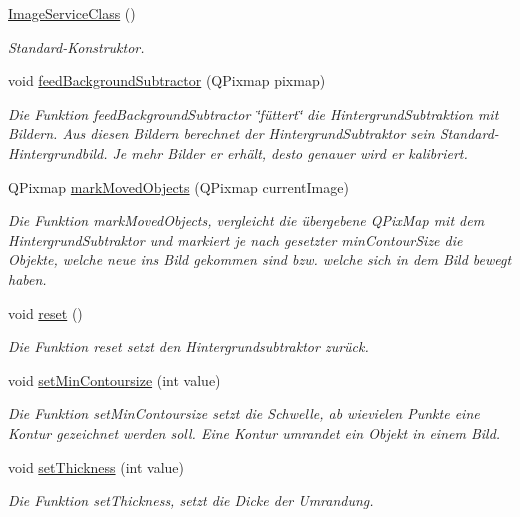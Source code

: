 \begin{DoxyCompactItemize}
\item 
\hypertarget{class_image_service_class_ac513fca164499b62c9527ee1c1ecaa5f}{}\hyperlink{class_image_service_class_ac513fca164499b62c9527ee1c1ecaa5f}{Image\+Service\+Class} ()\label{class_image_service_class_ac513fca164499b62c9527ee1c1ecaa5f}

\begin{DoxyCompactList}\small\item\em Standard-\/\+Konstruktor. \end{DoxyCompactList}\item 
void \hyperlink{class_image_service_class_a2285756f94ae97be90c4b22334dbff07}{feed\+Background\+Subtractor} (Q\+Pixmap pixmap)
\begin{DoxyCompactList}\small\item\em Die Funktion feed\+Background\+Subtractor \char`\"{}füttert\char`\"{} die Hintergrund\+Subtraktion mit Bildern. Aus diesen Bildern berechnet der Hintergrund\+Subtraktor sein Standard-\/\+Hintergrundbild. Je mehr Bilder er erhält, desto genauer wird er kalibriert. \end{DoxyCompactList}\item 
Q\+Pixmap \hyperlink{class_image_service_class_a2fa440841e840db5435e408ec07e7ae2}{mark\+Moved\+Objects} (Q\+Pixmap current\+Image)
\begin{DoxyCompactList}\small\item\em Die Funktion mark\+Moved\+Objects, vergleicht die übergebene Q\+Pix\+Map mit dem Hintergrund\+Subtraktor und markiert je nach gesetzter min\+Contour\+Size die Objekte, welche neue ins Bild gekommen sind bzw. welche sich in dem Bild bewegt haben. \end{DoxyCompactList}\item 
\hypertarget{class_image_service_class_abf1f01b616068d8794fb307067184eae}{}void \hyperlink{class_image_service_class_abf1f01b616068d8794fb307067184eae}{reset} ()\label{class_image_service_class_abf1f01b616068d8794fb307067184eae}

\begin{DoxyCompactList}\small\item\em Die Funktion reset setzt den Hintergrundsubtraktor zurück. \end{DoxyCompactList}\item 
void \hyperlink{class_image_service_class_a85b5cdecebd7406faf480c2321de5693}{set\+Min\+Contoursize} (int value)
\begin{DoxyCompactList}\small\item\em Die Funktion set\+Min\+Contoursize setzt die Schwelle, ab wievielen Punkte eine Kontur gezeichnet werden soll. Eine Kontur umrandet ein Objekt in einem Bild. \end{DoxyCompactList}\item 
void \hyperlink{class_image_service_class_aa65e0b1a885742a37f8cd1fa787794cf}{set\+Thickness} (int value)
\begin{DoxyCompactList}\small\item\em Die Funktion set\+Thickness, setzt die Dicke der Umrandung. \end{DoxyCompactList}\end{DoxyCompactItemize}


